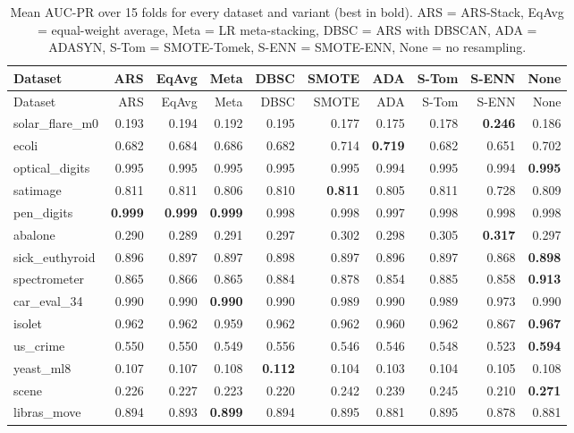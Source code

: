 {\small\setlength{\tabcolsep}{3.5pt}
\begin{longtable}{lrrrrrrrrr}
\caption{Mean AUC-PR over 15 folds for every dataset and variant (best in bold). ARS = ARS-Stack, EqAvg = equal-weight average, Meta = LR meta-stacking, DBSC = ARS with DBSCAN, ADA = ADASYN, S-Tom = SMOTE-Tomek, S-ENN = SMOTE-ENN, None = no resampling.}\label{tab:full_auc_pr}\\
\toprule
Dataset & ARS & EqAvg & Meta & DBSC & SMOTE & ADA & S-Tom & S-ENN & None \\
\midrule
\endfirsthead
\toprule
Dataset & ARS & EqAvg & Meta & DBSC & SMOTE & ADA & S-Tom & S-ENN & None \\
\midrule
\endhead
solar\_flare\_m0 & 0.193 & 0.194 & 0.192 & 0.195 & 0.177 & 0.175 & 0.178 & \textbf{0.246} & 0.186 \\
ecoli & 0.682 & 0.684 & 0.686 & 0.682 & 0.714 & \textbf{0.719} & 0.682 & 0.651 & 0.702 \\
optical\_digits & 0.995 & 0.995 & 0.995 & 0.995 & 0.995 & 0.994 & 0.995 & 0.994 & \textbf{0.995} \\
satimage & 0.811 & 0.811 & 0.806 & 0.810 & \textbf{0.811} & 0.805 & 0.811 & 0.728 & 0.809 \\
pen\_digits & \textbf{0.999} & \textbf{0.999} & \textbf{0.999} & 0.998 & 0.998 & 0.997 & 0.998 & 0.998 & 0.998 \\
abalone & 0.290 & 0.289 & 0.291 & 0.297 & 0.302 & 0.298 & 0.305 & \textbf{0.317} & 0.297 \\
sick\_euthyroid & 0.896 & 0.897 & 0.897 & 0.898 & 0.897 & 0.896 & 0.897 & 0.868 & \textbf{0.898} \\
spectrometer & 0.865 & 0.866 & 0.865 & 0.884 & 0.878 & 0.854 & 0.885 & 0.858 & \textbf{0.913} \\
car\_eval\_34 & 0.990 & 0.990 & \textbf{0.990} & 0.990 & 0.989 & 0.990 & 0.989 & 0.973 & 0.990 \\
isolet & 0.962 & 0.962 & 0.959 & 0.962 & 0.962 & 0.960 & 0.962 & 0.867 & \textbf{0.967} \\
us\_crime & 0.550 & 0.550 & 0.549 & 0.556 & 0.546 & 0.546 & 0.548 & 0.523 & \textbf{0.594} \\
yeast\_ml8 & 0.107 & 0.107 & 0.108 & \textbf{0.112} & 0.104 & 0.103 & 0.104 & 0.105 & 0.108 \\
scene & 0.226 & 0.227 & 0.223 & 0.220 & 0.242 & 0.239 & 0.245 & 0.210 & \textbf{0.271} \\
libras\_move & 0.894 & 0.893 & \textbf{0.899} & 0.894 & 0.895 & 0.881 & 0.895 & 0.878 & 0.881 \\

\end{longtable}}
